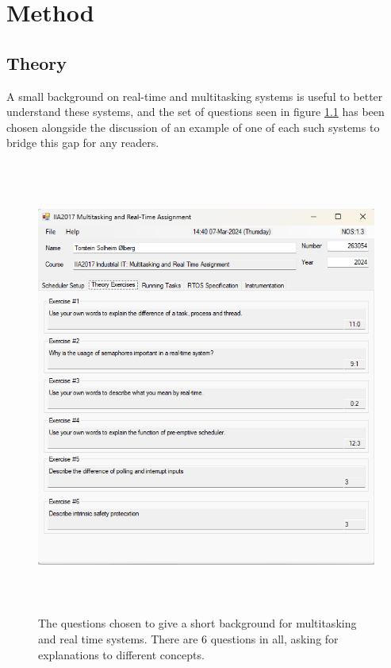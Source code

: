\documentclass[12pt, A4paper, english]{book}
\begin{document}
	\chapter{Method}
		\section{Theory}
\label{subsec:Theory}
A small background on real-time and multitasking systems is useful to better understand these systems, and the set of questions seen in figure \ref{im:theory} has been chosen alongside the discussion of an example of one of each such systems to bridge this gap for any readers. 
			\begin{figure}[H]
\includegraphics[width=\linewidth, height=15cm]{Parameters_2.png}
\caption{The questions chosen to give a short background for multitasking and real time systems. There are 6 questions in all, asking for explanations to different concepts.}
\label{im:theory}
			\end{figure}
\end{document}
